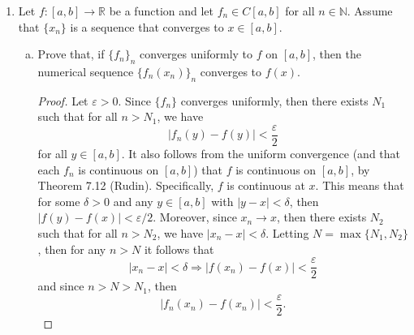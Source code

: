 \documentclass[12pt]{article}
\newenvironment{solution}
{\renewcommand\qedsymbol{$\blacksquare$}\begin{proof}[Solution]}
{\end{proof}}
\begin{document}
\begin{enumerate}
\begin{solution}
\begin{equation*}
                    \lim_{n\to\infty}\sup\{f_n(x)-f\}
                    =\lim_{n\to\infty}\frac{1}{2\sqrt{n}}=0.
                \end{equation*}
                By Theorem 7.9 (Rudin), $\{f_n\}$ converges uniformly to $f=0$. 
            \end{solution}
        \item Let $f:[a, b]\to\mathbb{R}$ be a function and let $f_n\in C[a,
            b]$ for all $n\in\mathbb{N}$. Assume that $\{x_n\}$ is a sequence
            that converges to $x\in[a, b]$.
            \begin{enumerate}[(a)]
                \item Prove that, if $\{f_n\}_n$ converges uniformly to $f$ on
                    $[a, b]$, then the numerical sequence $\{f_n(x_n)\}_n$
                    converges to $f(x)$. 
                    \begin{proof}
                        Let $\varepsilon>0$. Since $\{f_n\}$ converges
                        uniformly, then there exists $N_1$ such that for all
                        $n>N_1$, we have 
                        \begin{equation*}
                            |f_n(y)-f(y)|<\frac{\varepsilon}{2}
                        \end{equation*}
                        for all $y\in[a, b]$. It also follows from the uniform
                        convergence (and that each $f_n$ is continuous on $[a,
                        b]$) that $f$ is continuous on $[a, b]$, by Theorem
                        7.12 (Rudin). Specifically, $f$ is continuous at $x$.
                        This means that for some $\delta>0$ and any $y\in[a,
                        b]$ with $|y-x|<\delta$, then
                        $|f(y)-f(x)|<\varepsilon/2$. Moreover, since $x_n\to
                        x$, then there exists $N_2$ such that for all $n>N_2$,
                        we have $|x_n-x|<\delta$. Letting $N=\max\{N_1, N_2\}$,
                        then for any $n>N$ it follows that 
                        \begin{equation*}
                            |x_n-x|<\delta\Rightarrow|f(x_n)-f(x)|<\frac{\varepsilon}{2}
                        \end{equation*}
                        and since $n>N>N_1$, then 
                        \begin{equation*}
                            |f_n(x_n)-f(x_n)|<\frac{\varepsilon}{2}.
                        \end{equation*}

\end{proof}
\end{enumerate}
\end{enumerate}
\end{document}
